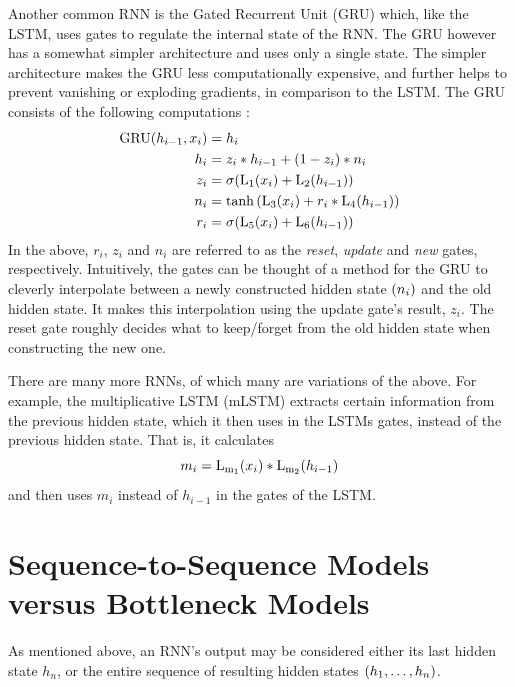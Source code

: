 Another common RNN is the Gated Recurrent Unit (GRU) which, like the LSTM, uses gates to regulate the internal state of the RNN. The GRU however has a somewhat simpler architecture and uses only a single state. The simpler architecture makes the GRU less computationally expensive, and further helps to prevent vanishing or exploding gradients, in comparison to the LSTM. The GRU consists of the following computations \cite{pytorchnn}:
\begin{align*}
    \mathrm{GRU}{\mathopen{} \left( h_{i - 1}, x_i \right) \mathclose{}} &= h_i \\
    h_i &= z_i * h_{i - 1} + {\mathopen{} \left( 1 - z_i \right) \mathclose{}} * n_i  \\
    z_i &= \mathrm{\sigma}{\mathopen{} \left( \mathrm{L_1}{\mathopen{} \left( x_i \right) \mathclose{}} + \mathrm{L_2}{\mathopen{} \left( h_{i - 1} \right) \mathclose{}} \right) \mathclose{}} \\
    n_i &= \tanh{\mathopen{} \left( \mathrm{L_3}{\mathopen{} \left( x_i \right) \mathclose{}} + r_i * \mathrm{L_4}{\mathopen{} \left( h_{i - 1} \right) \mathclose{}} \right) \mathclose{}} \\
    r_i &= \mathrm{\sigma}{\mathopen{} \left( \mathrm{L_5}{\mathopen{} \left( x_i \right) \mathclose{}} + \mathrm{L_6}{\mathopen{} \left( h_{i - 1} \right) \mathclose{}} \right) \mathclose{}}
\end{align*}
In the above, $r_i$, $z_i$ and $n_i$ are referred to as the \textit{reset}, \textit{update} and \textit{new} gates, respectively. Intuitively, the gates can be thought of a method for the GRU to cleverly interpolate between a newly constructed hidden state ${\mathopen{} \left( n_i \right) \mathclose{}}$ and the old hidden state. It makes this interpolation using the update gate's result, $z_i$. The reset gate roughly decides what to keep/forget from the old hidden state when constructing the new one.

There are many more RNNs, of which many are variations of the above. For example, the multiplicative LSTM (mLSTM) \cite{krause2016multiplicative} extracts certain information from the previous hidden state, which it then uses in the LSTMs gates, instead of the previous hidden state. That is, it calculates
\[m_i = \mathrm{L_{m_1}}{\mathopen{} \left( x_i \right) \mathclose{}} * \mathrm{L_{m_2}}{\mathopen{} \left( h_{i - 1} \right) \mathclose{}}\]
and then uses $m_i$ instead of $h_{i - 1}$ in the gates of the LSTM.

\section{Sequence-to-Sequence Models versus Bottleneck Models}
\label{sec:seq2seqvsbottleneck}
As mentioned above, an RNN's output may be considered either its last hidden state $h_n$, or the entire sequence of resulting hidden states ${\mathopen{} \left( h_1, \dots, h_n \right) \mathclose{}}$.

